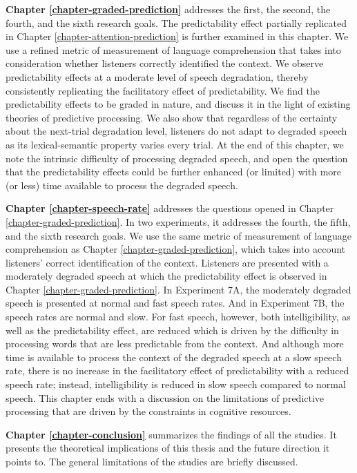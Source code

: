 \documentclass[a4paper, nobind]{templates/ociamthesis}
\begin{document}
\noindent
\textbf{Chapter \ref{chapter-graded-prediction}} addresses the first, the second, the fourth, and the sixth research goals.
The predictability effect partially replicated in Chapter \ref{chapter-attention-prediction} is further examined in this chapter.
We use a refined metric of measurement of language comprehension that takes into consideration whether listeners correctly identified the context.
We observe predictability effects at a moderate level of speech degradation, thereby consistently replicating the facilitatory effect of predictability.
We find the predictability effects to be graded in nature,
and discuss it in the light of existing theories of predictive processing.
We also show that regardless of the certainty about the next-trial degradation level,
listeners do not adapt to degraded speech as its lexical-semantic property varies every trial.
At the end of this chapter, we note the intrinsic difficulty of processing degraded speech, and open the question that the predictability effects could be further enhanced (or limited) with more (or less) time available to process the degraded speech.

\noindent
\textbf{Chapter \ref{chapter-speech-rate}} addresses the questions opened in Chapter \ref{chapter-graded-prediction}.
In two experiments, it addresses the fourth, the fifth, and the sixth research goals.
We use the same metric of measurement of language comprehension as Chapter \ref{chapter-graded-prediction}, which takes into account listeners' correct identification of the context.
Listeners are presented with a moderately degraded speech at which the predictability effect is observed in Chapter \ref{chapter-graded-prediction}.
In Experiment 7A, the moderately degraded speech is presented at normal and fast speech rates.
And in Experiment 7B, the speech rates are normal and slow.
For fast speech, however, both intelligibility, as well as the predictability effect, are reduced which is driven by the difficulty in processing words that are less predictable from the context.
And although more time is available to process the context of the degraded speech at a slow speech rate,
there is no increase in the facilitatory effect of predictability with a reduced speech rate;
instead, intelligibility is reduced in slow speech compared to normal speech.
This chapter ends with a discussion on the limitations of predictive processing that are driven by the constraints in cognitive resources.

\noindent
\textbf{Chapter \ref{chapter-conclusion}} summarizes the findings of all the studies.
It presents the theoretical implications of this thesis and the future direction it points to.
The general limitations of the studies are briefly discussed.
\end{document}
